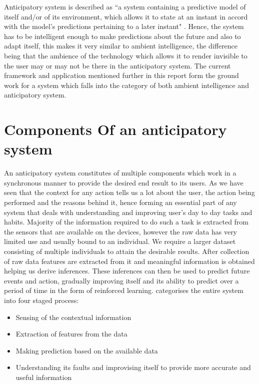 \documentclass[12pt]{report}
\begin{document}
Anticipatory system is described as ``a system containing a predictive model of itself and/or of its environment, which allows it to state at an instant in accord with the model's predictions pertaining to a later instant" \cite{rosen2012anticipatory}. Hence, the system has to be intelligent enough to make predictions about the future and also to adapt itself, this makes it very similar to ambient intelligence, the difference being that the ambience of the technology which allows it to render invisible to the user may or may not be there in the anticipatory system. The current framework and application mentioned further in this report form the ground work for a system which falls into the category of both ambient intelligence and anticipatory system.

\section{Components Of an anticipatory system}
An anticipatory system constitutes of multiple components which work in a synchronous manner to provide the desired end result to its users. As we have seen that the context for any action tells us a lot about the user, the action being performed and the reasons behind it, hence forming an essential part of any system that deals with understanding and improving user's day to day tasks and habits. Majority of the information required to do such a task is extracted from the sensors that are available on the devices, however the raw data has very limited use and usually bound to an individual. We require a larger dataset consisting of multiple individuals to attain the desirable results. After collection of raw data features are extracted from it and meaningful information is obtained helping us derive inferences. These inferences can then be used to predict future events and action, gradually improving itself and its ability to predict over a period of time in the form of reinforced learning. 
\cite{pejovic2013anticipatory} categorises the entire system into four staged process:

\begin{itemize}
\item Sensing of the contextual information
\item Extraction of features from the data
\item Making prediction based on the available data
\item Understanding its faults and improvising itself to provide more accurate and useful information
\end{itemize}
\end{document}
